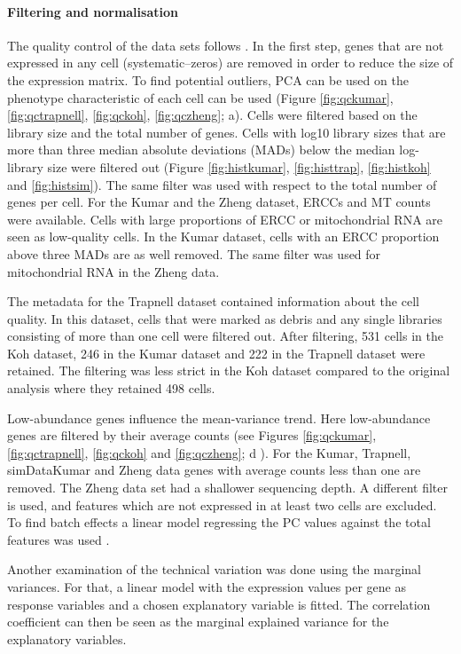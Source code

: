 \documentclass[11pt, a4paper]{article}\usepackage[]{graphicx}\usepackage[]{color}
\begin{document}
\newpage
\paragraph{Filtering and normalisation}
The quality control of the data sets follows \citet{lun2016step}. In the first step, genes that are not expressed in any cell (systematic--zeros) are removed in order to reduce the size of the expression matrix. To find potential outliers, PCA can be used on the phenotype characteristic of each cell can be used (Figure \ref{fig:qckumar}, \ref{fig:qctrapnell}, \ref{fig:qckoh}, \ref{fig:qczheng}; a). Cells were filtered based on the library size and the total number of genes.
Cells with log10 library sizes that are more than three median absolute deviations (MADs) below the median log-library size were filtered out (Figure \ref{fig:histkumar}, \ref{fig:histtrap}, \ref{fig:histkoh} and \ref{fig:histsim}). The same filter was used with respect to the total number of genes per cell. 
For the Kumar and the Zheng dataset, ERCCs and MT counts were available. Cells with large proportions of ERCC or mitochondrial RNA are seen as low-quality cells. In the Kumar dataset, cells with an ERCC proportion above three MADs are as well removed. The same filter was used for mitochondrial RNA in the Zheng data.

The metadata for the Trapnell dataset contained information about the cell quality. In this dataset, cells that were marked as debris and any single libraries consisting of more than one cell were filtered out. After filtering, 531 cells in the Koh dataset, 246 in the Kumar dataset and 222 in the Trapnell dataset were retained. The filtering was less strict in the Koh dataset compared to the original analysis where they retained 498 cells. 

Low-abundance genes influence the mean-variance trend. Here low-abundance genes are filtered by their average counts (see Figures \ref{fig:qckumar}, \ref{fig:qctrapnell}, \ref{fig:qckoh} and \ref{fig:qczheng}; d ). For the Kumar, Trapnell, simDataKumar and Zheng data genes with average counts less than one are removed. The Zheng data set had a shallower sequencing depth. A different filter is used, and features which are not expressed in at least two cells are excluded.
To find batch effects a linear model regressing the PC values against the total features was used \citep{lun2016step}. 

Another examination of the technical variation was done using the marginal variances\citep{lun2016step}. For that, a linear model with the expression values per gene as response variables and a chosen explanatory variable is fitted. The correlation coefficient can then be seen as the marginal explained variance for the explanatory variables.
\end{document}
